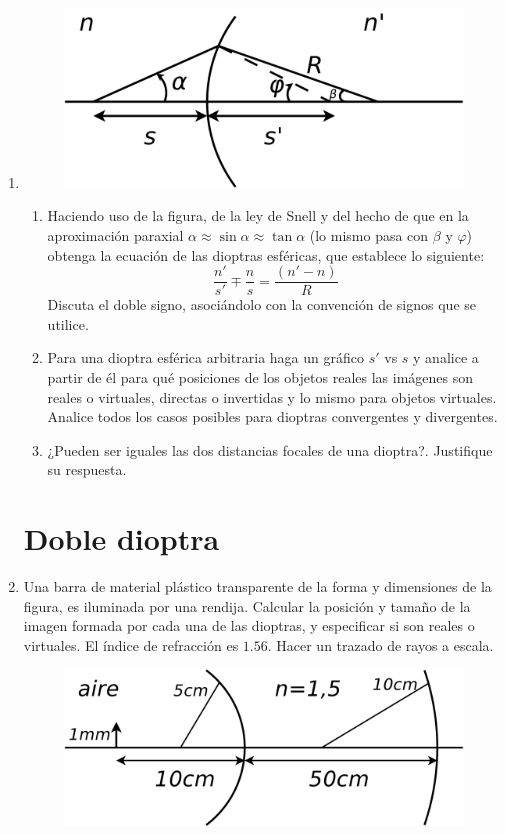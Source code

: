 \documentclass[11pt,spanish,a4paper]{article}
\begin{document}
\begin{enumerate}
\item
\begin{figure}[H]
\centering{}\includegraphics[clip,scale=0.25]{ej3-15}
\end{figure}
\begin{enumerate}
\item Haciendo uso de la figura, de la ley de Snell y del hecho de que en
la aproximación paraxial $\alpha\approx\sin\alpha\approx\tan\alpha$
(lo mismo pasa con $\beta$ y $\varphi$) obtenga la ecuación de las
dioptras esféricas, que establece lo siguiente:
\[
\frac{n'}{s'}\mp\frac{n}{s}=\frac{(n'-n)}{R}
\]
Discuta el doble signo, asociándolo con la convención de signos que
se utilice.
\item Para una dioptra esférica arbitraria haga un gráfico $s'$ vs $s$
y analice a partir de él para qué posiciones de los objetos reales
las imágenes son reales o virtuales, directas o invertidas y lo mismo
para objetos virtuales. Analice todos los casos posibles para dioptras
convergentes y divergentes.
\item ¿Pueden ser iguales las dos distancias focales de una dioptra?. Justifique
su respuesta.
\end{enumerate}


\section*{Doble dioptra}
\item Una barra de material plástico transparente de la forma y dimensiones
de la figura, es iluminada por una rendija. Calcular la posición y
tamaño de la imagen formada por cada una de las dioptras, y especificar
si son reales o virtuales. El índice de refracción es $1.56$. Hacer
un trazado de rayos a escala.
\begin{figure}[H]
\centering{}\includegraphics[clip,scale=0.25]{ej3-16}
\end{figure}



\end{enumerate}
\end{document}
